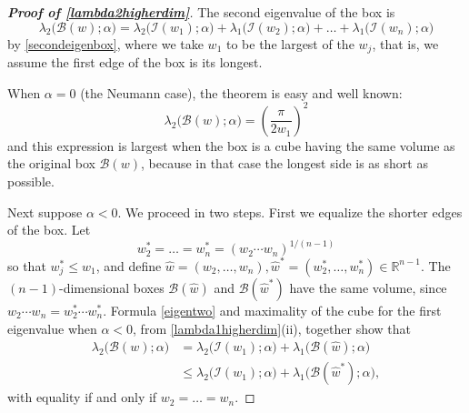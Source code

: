 \documentclass[12pt,reqno]{amsart}
\theoremstyle{definition}
\newcommand{\R}{{\mathbb R}}
\begin{document}
%
%
\begin{proof}[\bf Proof of \autoref{lambda2higherdim}]
The second eigenvalue of the box is 
%
\begin{equation} \label{eigentwo}
\lambda_2\big( \mathcal{B}(w) ; \alpha \big) = \lambda_2\big( \mathcal{I}(w_1) ; \alpha \big) + \lambda_1\big( \mathcal{I}(w_2) ; \alpha \big) + \dots + \lambda_1\big( \mathcal{I}(w_n) ; \alpha \big) 
\end{equation}
%
by \autoref{secondeigenbox}, where we take $w_1$ to be the largest of the $w_j$, that is, we assume the first edge of the box is its longest. 

When $\alpha=0$ (the Neumann case), the theorem is easy and well known: 
\[
\lambda_2\big( \mathcal{B}(w) ; \alpha \big) = \left( \frac{\pi}{2w_1} \right)^{\! \! 2} 
\]
and this expression is largest when the box is a cube having the same volume as the original box $\mathcal{B}(w)$, because in that case the longest side is as short as possible. 

Next suppose $\alpha<0$. We proceed in two steps. First we equalize the shorter edges of the box. Let 
\[
w_2^* = \dots = w_n^* =(w_2 \cdots w_n)^{1/(n-1)} 
\]
so that $w_j^* \leq w_1$, and define $\widehat{w}=(w_2,\dots,w_n) , \widehat{w}^*=(w_2^*,\dots,w_n^*) \in \R^{n-1}$. The $(n-1)$-dimensional boxes $\mathcal{B}(\widehat{w})$ and $\mathcal{B}(\widehat{w}^*)$ have the same volume, since $w_2 \cdots w_n = w_2^* \cdots w_n^*$. Formula \eqref{eigentwo} and maximality of the cube for the first eigenvalue when $\alpha<0$, from \autoref{lambda1higherdim}(ii), together show that 
%
\begin{align*}
\lambda_2\big( \mathcal{B}(w) ; \alpha \big) 
& = \lambda_2\big( \mathcal{I}(w_1) ; \alpha \big) + \lambda_1\big( \mathcal{B}(\widehat{w}) ; \alpha \big) \\
& \leq \lambda_2\big( \mathcal{I}(w_1) ; \alpha \big) + \lambda_1\big( \mathcal{B}(\widehat{w}^*) ; \alpha \big) ,
\end{align*}
%
with equality if and only if $w_2=\dots =w_n$. 


\end{proof}
\end{document}
